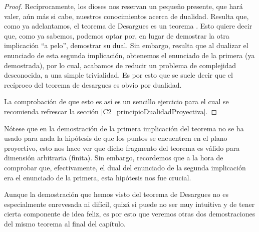 \begin{proof}
	Recíprocamente, los dioses nos reservan un pequeño presente, que hará valer, aún más si cabe, nuestros conocimientos acerca de dualidad. Resulta que, como ya adelantamos, el teorema de Desargues es un teorema . Esto quiere decir que, como ya sabemos, podemos optar por, en lugar de demostrar la otra implicación ``a pelo'', demostrar su dual. Sin embargo, resulta que al dualizar el enunciado de esta segunda implicación, obtenemos el enunciado de la primera (ya demostrada), por lo cual, acabamos de reducir un problema de complejidad desconocida, a una simple trivialidad. Es por esto que se suele decir que el recíproco del teorema de desargues es obvio por dualidad.
	
	La comprobación de que esto es así es un sencillo ejercicio para el cual se recomienda refrescar la sección \ref{C2_principioDualidadProyectiva}.
\end{proof}
Nótese que en la demostración de la primera implicación del teorema no se ha usado para nada la hipótesis de que los puntos se encuentren en el plano proyectivo, esto nos hace ver que dicho fragmento del teorema es válido para dimensión arbitraria (finita). Sin embargo, recordemos que a la hora de comprobar que, efectivamente, el dual del enunciado de la segunda implicación era el enunciado de la primera, esta hipótesis nos fue crucial.

Aunque la demostración que hemos visto del teorema de Desargues no es especialmente enrevesada ni difícil, quizá si puede no ser muy intuitiva y de tener cierta componente de idea feliz, es por esto que veremos otras dos demostraciones del mismo teorema al final del capítulo.
